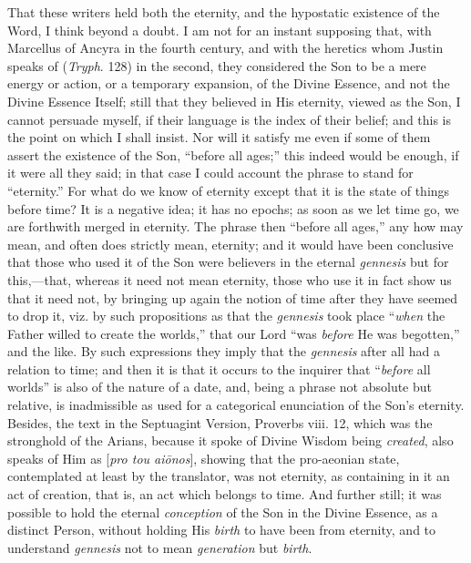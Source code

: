 That these writers held both the eternity, and the hypostatic
existence of the Word, I think beyond a doubt. I am not for an instant
supposing that, with Marcellus of Ancyra in the fourth century, and
with the heretics whom Justin speaks of (\emph{Tryph}. 128) in the
second, they considered the Son to be a mere energy or action, or a
temporary expansion, of the Divine Essence, and not the Divine Essence
Itself; still that they believed in His eternity, viewed as the Son, I
cannot persuade myself, if their language is the index of their
belief; and this is the point on which I shall insist. Nor will it
satisfy me even if some of them assert the existence of the Son,
``before all ages;'' this indeed would be enough, if it were
all they said; in that case I could account the phrase to stand for
``eternity.'' For what do we know of eternity except that it
is the state of things before time? It is a negative idea; it has no
epochs; as soon as we let time go, we are forthwith merged in
eternity. The phrase then ``before all ages,'' any how may
mean, and often does strictly mean, eternity; and it would have
been conclusive that those who used it of the Son were believers in
the eternal \emph{gennesis} but for this,—that, whereas it need not
mean eternity, those who use it in fact show us that it need not, by
bringing up again the notion of time after they have seemed to drop
it, viz. by such propositions as that the \emph{gennesis} took place
``\emph{when} the Father willed to create the worlds,'' that
our Lord ``was \emph{before} He was begotten,'' and the like.
By such expressions they imply that the \emph{gennesis} after all had
a relation to time; and then it is that it occurs to the inquirer that
``\emph{before} all worlds'' is also of the nature of a date,
and, being a phrase not absolute but relative, is inadmissible as used
for a categorical enunciation of the Son's eternity. Besides, the text
in the Septuagint Version, Proverbs viii. 12, which was the stronghold
of the Arians, because it spoke of Divine Wisdom being \emph{created},
also speaks of Him as [\emph{pro tou ai\={o}nos}], showing that the
pro-aeonian state, contemplated at least by the translator, was not
eternity, as containing in it an act of creation, that is, an act
which belongs to time. And further still; it was possible to hold the
eternal \emph{conception} of the Son in the Divine Essence, as a
distinct Person, without holding His \emph{birth} to have been from
eternity, and to understand \emph{gennesis} not to mean \emph{generation}
but \emph{birth}.

